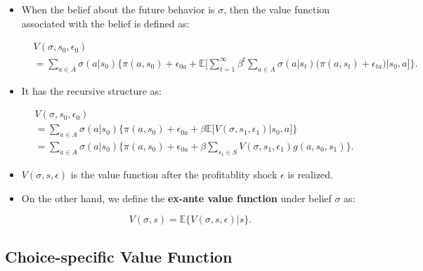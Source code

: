 \documentclass[]{book}
\providecommand{\tightlist}{%
  \setlength{\itemsep}{0pt}\setlength{\parskip}{0pt}}
\begin{document}
\begin{itemize}
\tightlist
\item
  When the belief about the future behavior is \(\sigma\), then the
  value function associated with the belief is defined as:

  \begin{equation}
  \begin{split}
  &V(\sigma, s_0, \epsilon_0)\\
  &= \sum_{a \in A} \sigma(a|s_0) \Bigg\{\pi(a, s_0) + \epsilon_{0a} + \mathbb{E}\Bigg[ \sum_{t = 1}^\infty \beta^t \sum_{a \in A}\sigma(a|s_t)\Bigg(\pi(a, s_t) + \epsilon_{ta}\Bigg)\Bigg|s_0, a\Bigg] \Bigg\}.
  \end{split}
  \end{equation}
\item
  It has the recursive structure as:

  \begin{equation}
  \begin{split}
  &V(\sigma, s_0, \epsilon_0)\\
  & = \sum_{a \in A} \sigma(a|s_0) \Bigg\{\pi(a, s_0) + \epsilon_{0a} + \beta \mathbb{E}\Bigg[V(\sigma, s_1, \epsilon_1)\Bigg|s_0, a\Bigg]\Bigg\}\\
  & = \sum_{a \in A} \sigma(a|s_0) \Bigg\{\pi(a, s_0) + \epsilon_{0a} + \beta \sum_{s_1 \in S} V(\sigma, s_1, \epsilon_1)g(a, s_0, s_1)\Bigg\}.
  \end{split}
  \end{equation}
\item
  \(V(\sigma, s, \epsilon)\) is the value function after the
  profitablity shock \(\epsilon\) is realized.
\item
  On the other hand, we define the \textbf{ex-ante value function} under
  belief \(\sigma\) as:

  \begin{equation}
  V(\sigma, s) = \mathbb{E}\{V(\sigma, s, \epsilon)|s\}.
  \end{equation}
\end{itemize}

\subsection{Choice-specific Value
Function}\label{choice-specific-value-function}
\end{document}
